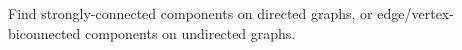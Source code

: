 Find strongly-connected components on directed graphs, or edge/vertex-biconnected components on undirected graphs.

\inputminted{cpp}{src/graph/cut/tarjan.cpp.com}

